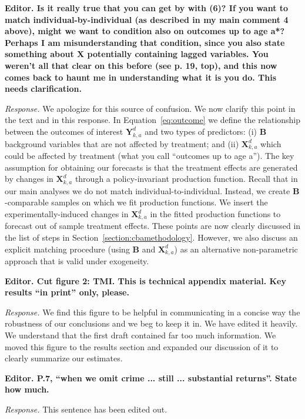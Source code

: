 \noindent \textbf{Editor. Is it really true that you can get by with (6)? If you want to match individual-by-individual (as described in my main comment 4 above), might we want to condition also on outcomes up to age a*? Perhaps I am misunderstanding that condition, since you also state something about X potentially containing lagged variables. You weren't all that clear on this before (see p. 19, top), and this now comes back to haunt me in understanding what it is you do. This needs clarification.}

\noindent \textit{Response.} We apologize for this source of confusion. We now clarify this point in the text and in this response. In Equation~\eqref{eq:outcome} we define the relationship between the outcomes of interest $\bm{Y}_{k,a}^d$ and two  types of predictors: (i) $\bm{B}$ background variables that are not affected by treatment; and (ii) $\bm{X}_{k,a}^d$ which could be affected by treatment (what you call ``outcomes up to age a''). The key assumption for obtaining our forecasts is that the treatment effects are generated by changes in $\bm{X}_{k,a}^d$ through a policy-invariant production function. Recall that in our main analyses we do not match individual-to-individual. Instead, we create $\bm{B}$-comparable samples on which we fit production functions. We insert the experimentally-induced changes in $\bm{X}_{k,a}^d$ in the fitted production functions to forecast out of sample treatment effects. These points are now clearly discussed in the list of steps in Section~\ref{section:cbamethodology}. However, we also discuss an explicit matching procedure (using $\bm{B}$ and $\bm{X}^d_{k,a}$) as an alternative non-parametric approach that is valid under exogeneity.

\noindent \textbf{Editor. Cut figure 2: TMI. This is technical appendix material. Key results ``in print'' only, please.}

\noindent \textit{Response.} We find this figure to be helpful in communicating in a concise way the robustness of our conclusions and we beg to keep it in. We have edited it heavily. We understand that the first draft contained far too much information. We moved this figure to the results section and expanded our discussion of it to clearly summarize our estimates.

\noindent \textbf{Editor. P.7, ``when we omit crime ... still ... substantial returns''. State how much.}

\noindent \textit{Response.} This sentence has been edited out.

